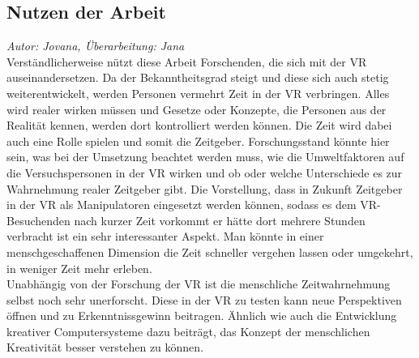 \documentclass{Bericht}
\begin{document}
\subsection{Nutzen der Arbeit}
\textit{Autor: Jovana, Überarbeitung: Jana}\\
Verständlicherweise nützt diese Arbeit Forschenden, die sich mit der VR auseinandersetzen.
Da der Bekanntheitsgrad steigt und diese sich auch stetig weiterentwickelt, werden Personen vermehrt Zeit in der VR verbringen. Alles wird realer wirken müssen und Gesetze oder Konzepte, die Personen aus der Realität kennen, werden dort kontrolliert werden können. Die Zeit wird dabei auch eine Rolle spielen und somit die Zeitgeber. 
Forschungsstand könnte hier sein, was bei der Umsetzung beachtet werden muss, wie die Umweltfaktoren auf die Versuchspersonen in der VR wirken und ob oder welche Unterschiede es zur Wahrnehmung realer Zeitgeber gibt. Die Vorstellung, dass in Zukunft Zeitgeber in der VR als Manipulatoren eingesetzt werden können, sodass es dem VR-Besuchenden nach kurzer Zeit vorkommt er hätte dort mehrere Stunden verbracht ist ein sehr interessanter Aspekt. Man könnte in einer menschgeschaffenen Dimension die Zeit schneller vergehen lassen oder umgekehrt, in weniger Zeit mehr erleben.\\
Unabhängig von der Forschung der VR ist die menschliche Zeitwahrnehmung selbst noch sehr unerforscht. Diese in der VR zu testen kann neue Perspektiven öffnen und zu Erkenntnissgewinn beitragen. Ähnlich wie auch die Entwicklung kreativer Computersysteme dazu beiträgt, das Konzept der menschlichen Kreativität besser verstehen zu können\cite{comp}.
\end{document}

